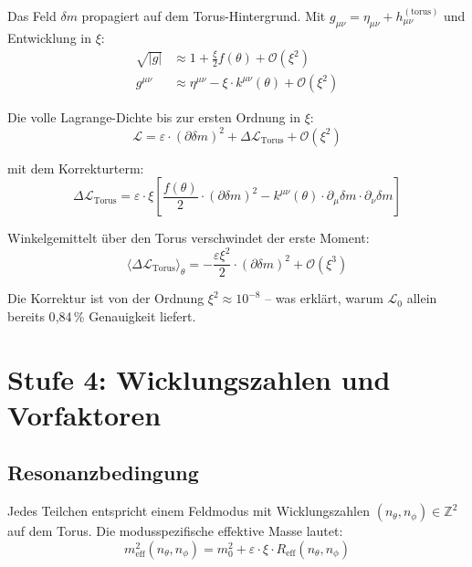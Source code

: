 Das Feld $\delta m$ propagiert auf dem Torus-Hintergrund. Mit
$g_{\mu\nu} = \eta_{\mu\nu} + h_{\mu\nu}^{(\mathrm{torus})}$
und Entwicklung in $\xi$:
\begin{align}
    \sqrt{|g|} &\approx 1 + \frac{\xi}{2} f(\theta) + \mathcal{O}(\xi^2) \\
    g^{\mu\nu} &\approx \eta^{\mu\nu} - \xi \cdot k^{\mu\nu}(\theta)
    + \mathcal{O}(\xi^2)
\end{align}

Die volle Lagrange-Dichte bis zur ersten Ordnung in $\xi$:
\begin{equation}
    \mathcal{L} = \varepsilon \cdot (\partial\delta m)^2
    + \Delta\mathcal{L}_{\mathrm{Torus}} + \mathcal{O}(\xi^2)
\end{equation}

mit dem Korrekturterm:
\begin{equation}
    \boxed{
    \Delta\mathcal{L}_{\mathrm{Torus}} = \varepsilon \cdot \xi \left[
    \frac{f(\theta)}{2} \cdot (\partial\delta m)^2
    - k^{\mu\nu}(\theta) \cdot \partial_\mu\delta m \cdot \partial_\nu\delta m
    \right]
    }
    \label{eq:deltaL}
\end{equation}

Winkelgemittelt über den Torus verschwindet der erste Moment:
\begin{equation}
    \langle \Delta\mathcal{L}_{\mathrm{Torus}} \rangle_\theta
    = -\frac{\varepsilon \xi^2}{2} \cdot (\partial\delta m)^2
    + \mathcal{O}(\xi^3)
\end{equation}

Die Korrektur ist von der Ordnung $\xi^2 \approx 10^{-8}$ -- was erklärt,
warum $\mathcal{L}_0$ allein bereits 0{,}84\,\% Genauigkeit liefert.

\section{Stufe 4: Wicklungszahlen und Vorfaktoren}

\subsection{Resonanzbedingung}

Jedes Teilchen entspricht einem Feldmodus mit Wicklungszahlen
$(n_\theta, n_\phi) \in \mathbb{Z}^2$ auf dem Torus. Die
modusspezifische effektive Masse lautet:
\begin{equation}
    m_{\mathrm{eff}}^2(n_\theta, n_\phi)
    = m_0^2 + \varepsilon \cdot \xi \cdot R_{\mathrm{eff}}(n_\theta, n_\phi)
\end{equation}

